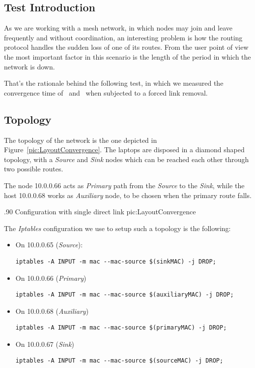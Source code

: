 \subsection{Test Introduction}

    As we are working with a mesh network, in which nodes may join
    and leave frequently and without coordination, an interesting problem
    is how the routing protocol handles the sudden loss of one of its
    routes. From the user point of view the most important factor in this
    scenario is the length of the period in which the network is down.

    That's the rationale behind the following test, in which we measured
    the convergence time of \batman\ and \olsr\ when subjected to a forced
    link removal.

\subsection{Topology}

    The topology of the network is the one depicted in
    Figure~\ref{pic:LayoutConvergence}. The laptops are disposed in a
    diamond shaped topology, with a \emph{Source} and \emph{Sink} nodes
    which can be reached each other through two possible routes.

    The node 10.0.0.66 acts as \emph{Primary} path from the \emph{Source}
    to the \emph{Sink}, while the host 10.0.0.68 works as \emph{Auxiliary}
    node, to be chosen when the primary route falls.

            {.90\columnwidth}
            {Configuration with single direct link}
            {pic:LayoutConvergence}

    \noindent The \emph{Iptables} configuration we use to setup such a topology is
    the following:

    \begin{itemize}
    \item On 10.0.0.65 (\emph{Source}):

\begin{verbatim}
iptables -A INPUT -m mac --mac-source $(sinkMAC) -j DROP;
\end{verbatim}

    \item On 10.0.0.66 (\emph{Primary})
\begin{verbatim}
iptables -A INPUT -m mac --mac-source $(auxiliaryMAC) -j DROP;
\end{verbatim}

    \item On 10.0.0.68 (\emph{Auxiliary})
\begin{verbatim}
iptables -A INPUT -m mac --mac-source $(primaryMAC) -j DROP;
\end{verbatim}

    \item On 10.0.0.67 (\emph{Sink})
\begin{verbatim}
iptables -A INPUT -m mac --mac-source $(sourceMAC) -j DROP;
\end{verbatim}
\end{itemize}

